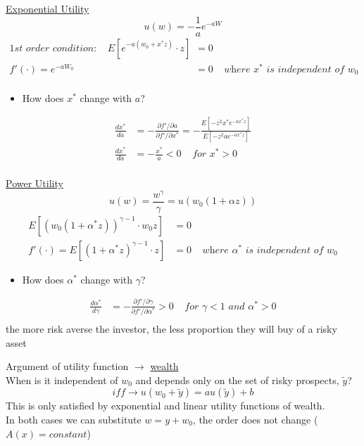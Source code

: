\documentclass[
14pt,notheorems,hyperref={pdfauthor=whatever}
]{beamer}
\begin{document}
\begin{frame}
\underline{Exponential Utility}
\[u(w) = -\frac{1}{a}e^{-aW}\]
\begin{align*}
    \textit{1st order condition:}\;\;\;\; E[e^{-a(w_0+x^*z)} \cdot z] &= 0\\
    f'(\cdot) = e^{-aW_0} &= 0\;\;\;\;\textit{where $x^*$ is independent of $w_0$}\\
\end{align*}
\begin{itemize}
    \item How does $x^*$ change with $a$?\\
\end{itemize}
\begin{align*}
    \frac{dx^*}{da} &= -\frac{\partial f'/\partial a}{\partial f'/\partial x^*} = -\frac{E[-z^2 x^*e^{-ax^*z}]}{E[-z^2 ae^{-ax^*z}]}\\
    \frac{dx^*}{da} &= -\frac{x^*}{a}<0 \;\;\;\; \textit{for $x^*>0$}\\
\end{align*}
\end{frame}

\begin{frame}
\underline{Power Utility}
\[u(w) = \frac{w^\gamma}{\gamma} = u(w_0(1+\alpha z))\]
\begin{align*}
    E[(w_0(1+\alpha^*z))^{\gamma-1}\cdot w_0z] &= 0\\
    f'(\cdot) = E[(1+\alpha^*z)^{\gamma-1}\cdot z] &= 0\;\;\;\;\textit{where $\alpha^*$ is independent of $w_0$}
\end{align*}
\begin{itemize}
    \item How does $\alpha^*$ change with $\gamma$?\\
\end{itemize}
\begin{align*}
    \frac{d\alpha^*}{d\gamma} &= -\frac{\partial f'/\partial \gamma}{\partial f'/\partial \alpha^*} >0 \;\;\;\; \textit{for $\gamma<1$ and $\alpha^*>0$}\\
\end{align*}
the more risk averse the investor, the less proportion they will buy of a risky asset
\end{frame}

\begin{frame}
Argument of utility function $\rightarrow$ \underline{wealth}\\
\hfill \break
When is it independent of $w_0$ and depends only on the set of risky prospects, $\tilde y$?\\
\[iff\rightarrow u(w_0+\tilde y) = a u(\tilde y) + b\]
This is only satisfied by exponential and linear utility functions of wealth.\\
\hfill \break
In both cases we can substitute $w = y+w_0$, the order does not change ($A(x) = constant$)
\end{frame}
\end{document}
